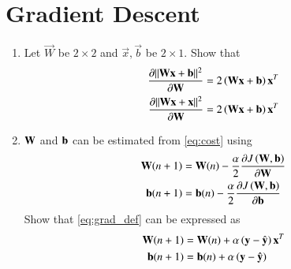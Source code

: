 \documentclass[journal,12pt,twocolumn]{IEEEtran}
\renewcommand\thesection{\arabic{section}}
\begin{document}
\begin{enumerate}[label=\thesection.\arabic*
,ref=\thesection.\theenumi]
%

\end{enumerate}
\section{Gradient Descent}
\begin{enumerate}[label=\thesection.\arabic*
,ref=\thesection.\theenumi]
\item Let $\vec{W}$ be $2\times 2$ and $\vec{x},\vec{b}$ be $2\times 1$.  Show that 
\begin{align}
\label{eq:grad_def}
\frac{\partial \lVert\mathbf{W}\mathbf{x}+\mathbf{b}\rVert^2 }{\partial\mathbf{W}} &= 2\left(\mathbf{W}\mathbf{x}+\mathbf{b}\right)\mathbf{x}^T
\\
\frac{\partial \lVert\mathbf{W}\mathbf{x}+\mathbf{x}\rVert^2 }{\partial\mathbf{W}} &= 2\left(\mathbf{W}\mathbf{x}+\mathbf{b}\right)\mathbf{x}^T
\end{align}
\item $\mathbf{W}$ and $\mathbf{b}$ can be estimated from \eqref{eq:cost} using
\begin{align}
\label{eq:grad_def}
\mathbf{W}(n+1) &= \mathbf{W}(n) - \frac{\alpha}{2}\frac{\partial J\left(\mathbf{W},\mathbf{b}\right) }{\partial\mathbf{W}}
\\
\mathbf{b}(n+1) &= \mathbf{b}(n) - \frac{\alpha}{2}\frac{\partial J\left(\mathbf{W},\mathbf{b}\right)}{\partial\mathbf{b}}
\end{align}
Show that \eqref{eq:grad_def} can be expressed as
\begin{align}
\mathbf{W}(n+1) &= \mathbf{W}(n) + \alpha\left(\mathbf{y}-\hat{\mathbf{y}}\right)\mathbf{x}^T
\\
\mathbf{b}(n+1) &= \mathbf{b}(n) + \alpha\left(\mathbf{y}-\hat{\mathbf{y}}\right)
\end{align}

\end{enumerate}
\end{document}
